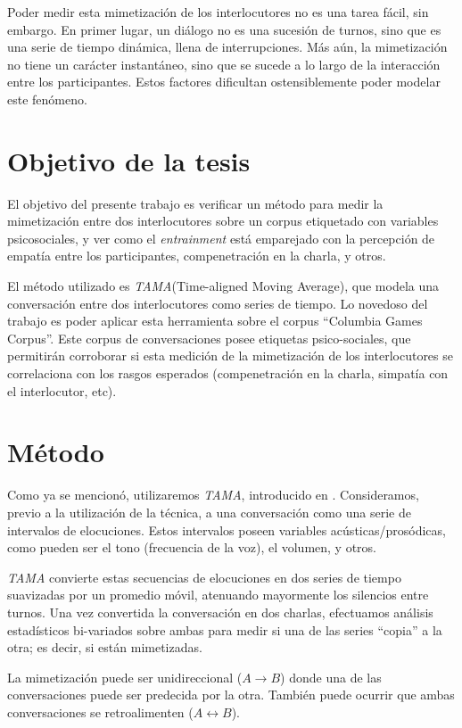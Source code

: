 \documentclass[a4paper,11pt]{article}
\begin{document}
Poder medir esta mimetización de los interlocutores no es una tarea fácil, sin embargo. En primer lugar, un diálogo no es una sucesión de turnos, sino que es una serie de tiempo dinámica, llena de interrupciones. Más aún, la mimetización no tiene un carácter instantáneo, sino que se sucede a lo largo de la interacción entre los participantes. Estos factores dificultan ostensiblemente poder modelar este fenómeno.

\section*{Objetivo de la tesis}

El objetivo del presente trabajo es verificar un método para medir la mimetización entre dos interlocutores sobre un corpus etiquetado con variables psicosociales, y ver como el \emph{entrainment} está emparejado con la percepción de empatía entre los participantes, compenetración en la charla, y otros.

El método utilizado es \emph{TAMA}(Time-aligned Moving Average), que modela una conversación entre dos interlocutores como series de tiempo. Lo novedoso del trabajo es poder aplicar esta herramienta sobre el corpus ``Columbia Games Corpus''. Este corpus de conversaciones posee etiquetas psico-sociales, que permitirán corroborar si esta medición de la mimetización de los interlocutores se correlaciona con los rasgos esperados (compenetración en la charla, simpatía con el interlocutor, etc).

\section*{Método}

Como ya se mencionó, utilizaremos \emph{TAMA}, introducido en \cite{KOU2009}. Consideramos, previo a la utilización de la técnica, a una conversación como una serie de intervalos de elocuciones. Estos intervalos poseen variables acústicas/prosódicas, como pueden ser el tono (frecuencia de la voz), el volumen, y otros.

\emph{TAMA} convierte estas secuencias de elocuciones en dos series de tiempo suavizadas por un promedio móvil, atenuando mayormente los silencios entre turnos. Una vez convertida la conversación en dos charlas, efectuamos análisis estadísticos bi-variados sobre ambas para medir si una de las series ``copia'' a la otra; es decir, si están mimetizadas.

La mimetización puede ser unidireccional ($A \rightarrow B$) donde una de las conversaciones puede ser predecida por la otra. También puede ocurrir que ambas conversaciones se retroalimenten ($A \leftrightarrow B$).
\end{document}
